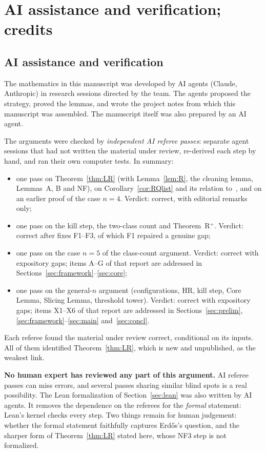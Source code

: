 \section{AI assistance and verification; credits}\label{sec:ai}

\subsection*{AI assistance and verification}
The mathematics in this manuscript was developed by AI agents (Claude, Anthropic) in research sessions directed by the
team. The agents proposed the strategy, proved the lemmas, and wrote the project notes from which this manuscript was
assembled. The manuscript itself was also prepared by an AI agent.

The arguments were checked by \emph{independent AI referee passes}: separate agent sessions that had not written the
material under review, re-derived each step by hand, and ran their own computer tests. In summary:
\begin{itemize}[leftmargin=1.5em]
\item one pass on Theorem~\ref{thm:LR} (with Lemma~\ref{lem:R}, the cleaning lemma, Lemmas~A, B and NF), on
  Corollary~\ref{cor:RQlist} and its relation to~\cite{SingerSudan}, and on an earlier proof of the case $n=4$. Verdict:
  correct, with editorial remarks only;
\item one pass on the kill step, the two-class count and Theorem~R$^+$. Verdict: correct after fixes F1--F3, of which
  F1 repaired a genuine gap;
\item one pass on the case $n=5$ of the class-count argument. Verdict: correct with expository gaps; items A--G of that
  report are addressed in Sections~\ref{sec:framework}--\ref{sec:core};
\item one pass on the general-$n$ argument (configurations, HR, kill step, Core Lemma, Slicing Lemma, threshold tower).
  Verdict: correct with expository gaps; items X1--X6 of that report are addressed in Sections~\ref{sec:prelim},
  \ref{sec:framework}--\ref{sec:main} and~\ref{sec:concl}.
\end{itemize}
Each referee found the material under review correct, conditional on its inputs. All of them identified
Theorem~\ref{thm:LR}, which is new and unpublished, as the weakest link.

\textbf{No human expert has reviewed any part of this argument.} AI referee passes can miss errors, and several
passes sharing similar blind spots is a real possibility. The Lean formalization of Section~\ref{sec:lean} was also
written by AI agents. It removes the dependence on the referees for the \emph{formal} statement: Lean's kernel checks
every step. Two things remain for human judgement: whether the formal statement faithfully captures Erd\H{o}s's
question, and the sharper form of Theorem~\ref{thm:LR} stated here, whose NF3 step is not formalized.

